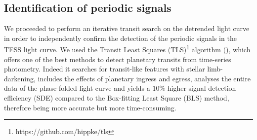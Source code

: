 \documentclass{aa}
\begin{document}
\subsection{Identification of periodic signals}

We proceeded to perform an iterative  transit search on the detrended light curve in order to independently confirm the detection of the periodic signals in the TESS light curve.
We used  the Transit Least Squares (TLS)\footnote{https://github.com/hippke/tls} algorithm (\cite{Hippke2}), which offers one of the best methods to detect planetary transits from time-series photometry. Indeed it searches for transit-like features with stellar limb-darkening, includes the effects of planetary ingress and egress, analyses the entire data of the phase-folded light curve and yields a $10 \% $ higher signal detection efficiency (SDE) compared to the Box-fitting Least Square (BLS) method, therefore being more accurate but more time-consuming. 
\end{document}
